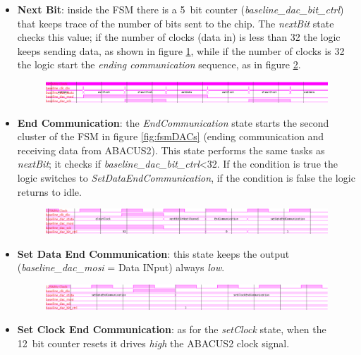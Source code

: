 \begin{itemize}
\begin{figure}[H]
	\end{figure}
	\item \textbf{Next Bit}: inside the FSM there is a 5~bit counter (\textit{baseline\_dac\_bit\_ctrl}) that keeps trace of the number of bits sent to the chip. The \textit{nextBit} state checks this value; if the number of clocks (data in) is less than 32 the logic keeps sending data, as shown in figure \ref{fig:fsmcluster1}, while if the number of clocks is 32 the logic start the \textit{ending communication} sequence, as in figure \ref{fig:fsmendcommunication}.
	\begin{figure}[H]
		\centering
		\includegraphics[width=1.0\linewidth]{IMG/ch4/DACsimulations/FSMcluster1}
		\caption{}
		\label{fig:fsmcluster1}
	\end{figure}
	\item \textbf{End Communication}: the \textit{EndCommunication} state starts the second cluster of the FSM in figure \ref{fig:fsmDACs} (ending communication and receiving data from ABACUS2). This state performs the same tasks as \textit{nextBit}; it checks if \textit{baseline\_dac\_bit\_ctrl}<32.
	If the condition is true the logic switches to \textit{SetDataEndCommunication}, if the condition is false the logic returns to idle. 
	\begin{figure}[H]
		\centering
		\includegraphics[width=1.0\linewidth]{IMG/ch4/DACsimulations/FSMendcommunication}
		\caption{}
		\label{fig:fsmendcommunication}
	\end{figure}
	\item \textbf{Set Data End Communication}: this state keeps the output (\textit{baseline\_dac\_mosi} = Data INput) always \textit{low}.
	\begin{figure}[H]
		\centering
		\includegraphics[width=1.0\linewidth]{IMG/ch4/DACsimulations/FSMsetdataendcommunication}
		\caption{}
		\label{fig:fsmsetdataendcommunication}
	\end{figure}
	\item \textbf{Set Clock End Communication}: as for the \textit{setClock} state, when the 12~bit counter resets it drives \textit{high} the ABACUS2 clock signal.

\end{itemize}
